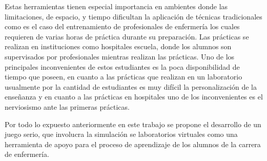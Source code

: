 Estas herramientas tienen especial importancia en ambientes donde las
limitaciones, de espacio, y tiempo dificultan la aplicación de técnicas
tradicionales\cite{education:games} como es el caso del entrenamiento de
profesionales de enfermería los cuales requieren de varias horas de práctica
durante su preparación. Las prácticas se realizan en instituciones como
hospitales escuela, donde los alumnos son supervisados por profesionales
mientras realizan las prácticas. Uno de los principales inconvenientes de estos
estudiantes es la poca disponibilidad de tiempo que poseen, en cuanto a las
prácticas que realizan en un laboratorio usualmente por la cantidad de
estudiantes es muy difícil la personalización de la enseñanza y en cuanto a las
prácticas en hospitales uno de los inconvenientes es el nerviosismo ante las
primeras prácticas.


Por todo lo expuesto anteriormente en este trabajo se propone  el desarrollo de
un juego serio, que involucra la simulación se laboratorios virtuales como una
herramienta de apoyo para el proceso de aprendizaje de los alumnos de la carrera
de enfermería.




